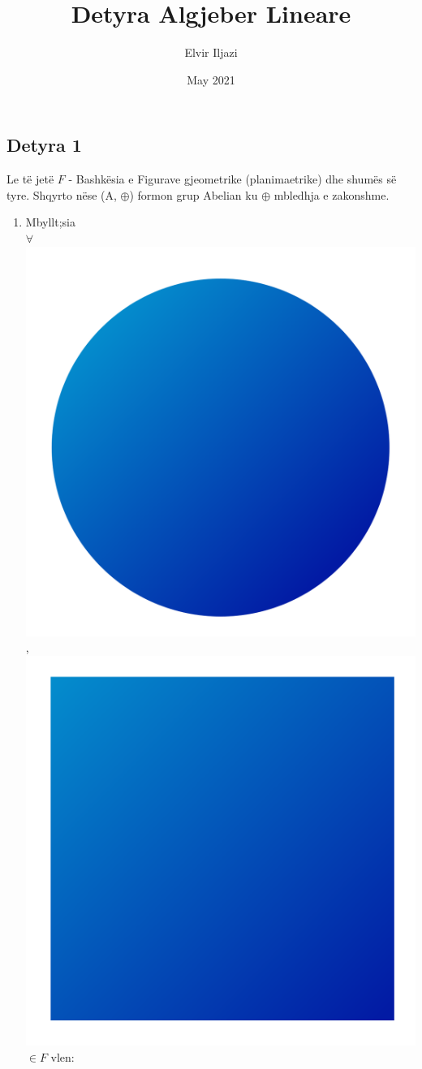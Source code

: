 \documentclass[12pt]{article}
\title{Detyra Algjeber Lineare}
\author{Elvir Iljazi}
\date{May 2021}
\begin{document}
\maketitle
\subsection*{Detyra 1}
Le të jetë $F$ - Bashkësia e Figurave gjeometrike (planimaetrike) dhe shumës së tyre. Shqyrto nëse (A, $\oplus$) formon grup Abelian ku $\oplus$ mbledhja e zakonshme.\par
\begin{enumerate}
    \item Mbyllt;sia\\
          $\forall$ \includegraphics[scale=.012]{circle.png}, \includegraphics[scale=.012]{square.png} $\in F$ vlen:\\

\end{enumerate}
\end{document}
